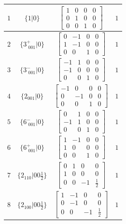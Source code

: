 \documentclass[fleqn,8pt]{jsarticle}
\begin{document}
\begin{longtable}{cccc}
$ 1 $ & $ \{1|0\} $ & $ \begin{bmatrix} 1 & 0 & 0 & 0 \\ 0 & 1 & 0 & 0 \\ 0 & 0 & 1 & 0 \end{bmatrix} $ & $ 1 $ \\ \hline
$ 2 $ & $ \{3^{+}_{\,\,001}|0\} $ & $ \begin{bmatrix} 0 & -1 & 0 & 0 \\ 1 & -1 & 0 & 0 \\ 0 & 0 & 1 & 0 \end{bmatrix} $ & $ 1 $ \\ \hline
$ 3 $ & $ \{3^{-}_{\,\,001}|0\} $ & $ \begin{bmatrix} -1 & 1 & 0 & 0 \\ -1 & 0 & 0 & 0 \\ 0 & 0 & 1 & 0 \end{bmatrix} $ & $ 1 $ \\ \hline
$ 4 $ & $ \{2{}_{001}|0\} $ & $ \begin{bmatrix} -1 & 0 & 0 & 0 \\ 0 & -1 & 0 & 0 \\ 0 & 0 & 1 & 0 \end{bmatrix} $ & $ 1 $ \\ \hline
$ 5 $ & $ \{6^{-}_{\,\,001}|0\} $ & $ \begin{bmatrix} 0 & 1 & 0 & 0 \\ -1 & 1 & 0 & 0 \\ 0 & 0 & 1 & 0 \end{bmatrix} $ & $ 1 $ \\ \hline
$ 6 $ & $ \{6^{+}_{\,\,001}|0\} $ & $ \begin{bmatrix} 1 & -1 & 0 & 0 \\ 1 & 0 & 0 & 0 \\ 0 & 0 & 1 & 0 \end{bmatrix} $ & $ 1 $ \\ \hline
$ 7 $ & $ \{2{}_{110}|0 0 \frac{1}{2}\} $ & $ \begin{bmatrix} 0 & 1 & 0 & 0 \\ 1 & 0 & 0 & 0 \\ 0 & 0 & -1 & \frac{1}{2} \end{bmatrix} $ & $ 1 $ \\ \hline
$ 8 $ & $ \{2{}_{100}|0 0 \frac{1}{2}\} $ & $ \begin{bmatrix} 1 & -1 & 0 & 0 \\ 0 & -1 & 0 & 0 \\ 0 & 0 & -1 & \frac{1}{2} \end{bmatrix} $ & $ 1 $ \\ \hline

\end{longtable}
\end{document}
